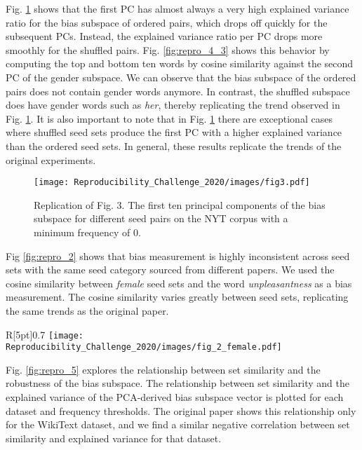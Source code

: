 Fig. \ref{fig:repro_3} shows that the first PC has almost always a very high explained variance
ratio for the bias subspace of ordered pairs, which drops off quickly for the subsequent PCs.
Instead, the explained variance ratio per PC drops more smoothly for the shuffled pairs. Fig.
\ref{fig:repro_4_3} shows this behavior by computing the top and bottom ten words by cosine
similarity against the second PC of the gender subspace. We can observe that the bias subspace of
the ordered pairs does not contain gender words anymore. In contrast, the shuffled subspace does
have gender words such as \textit{her}, thereby replicating the trend observed in Fig.
\ref{fig:repro_3}. It is also important to note that in Fig. \ref{fig:repro_3} there are exceptional
cases where shuffled seed sets produce the first PC with a higher explained variance than the
ordered seed sets. In general, these results replicate the trends of the original experiments.

\begin{figure}[ht]
	\centering
	\texttt{[image: Reproducibility\_Challenge\_2020/images/fig3.pdf]}
	\caption{Replication of Fig. 3. The first ten principal components of the bias subspace for different seed pairs on the NYT corpus with a minimum frequency of 0.}
	\label{fig:repro_3}
\end{figure}

Fig \ref{fig:repro_2} shows that bias measurement is highly inconsistent across seed sets with the
same seed category sourced from different papers. We used the cosine similarity between
\textit{female} seed sets and the word \textit{unpleasantness} as a bias measurement. The cosine
similarity varies greatly between seed sets, replicating the same trends as the original paper.

\begin{wrapfigure}{R}[5pt]{0.7\textwidth}
	\centering
	\texttt{[image: Reproducibility\_Challenge\_2020/images/fig\_2\_female.pdf]}
	\caption{\label{fig:repro_2}Reproduction of Fig. 2. Displaying the cosine similarity between the averaged vector of \textit{unpleasantness} across all 20 bootstrapped models and different seeds sets of the category \textit{female}.}
\end{wrapfigure}

Fig. \ref{fig:repro_5} explores the relationship between set similarity and the robustness of the
bias subspace. The relationship between set similarity and the explained variance of the PCA-derived
bias subspace vector is plotted for each dataset and frequency thresholds. The original paper shows
this relationship only for the WikiText dataset, and we find a similar negative correlation between
set similarity and explained variance for that dataset.

